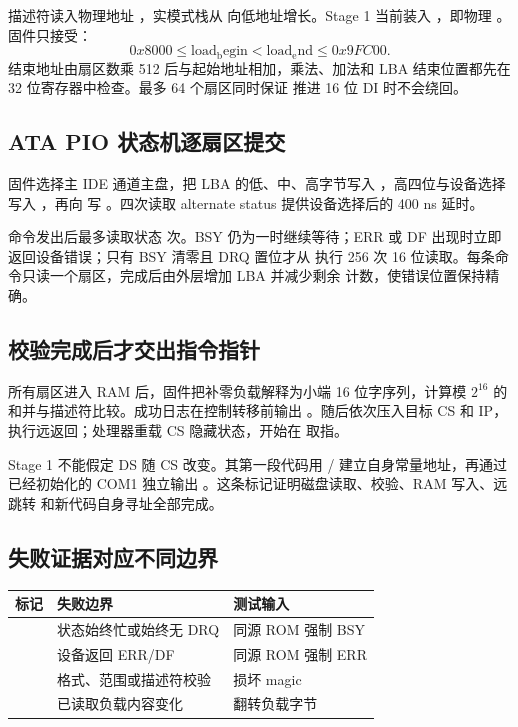 描述符读入物理地址 ，实模式栈从 
向低地址增长。Stage 1 当前装入 ，即物理
。固件只接受：
\[
  0x8000 \leq \mathrm{load_begin}
  < \mathrm{load_end} \leq 0x9FC00.
\]
结束地址由扇区数乘 512 后与起始地址相加，乘法、加法和 LBA 结束位置都先在
32 位寄存器中检查。最多 64 个扇区同时保证  推进 16 位 DI
时不会绕回。

\subsection{ATA PIO 状态机逐扇区提交}

固件选择主 IDE 通道主盘，把 LBA 的低、中、高字节写入
，高四位与设备选择写入 ，再向
 写 。四次读取 alternate status 提供设备选择后的
400 ns 延时。

命令发出后最多读取状态  次。BSY 仍为一时继续等待；ERR 或 DF
出现时立即返回设备错误；只有 BSY 清零且 DRQ 置位才从  执行
256 次 16 位读取。每条命令只读一个扇区，完成后由外层增加 LBA 并减少剩余
计数，使错误位置保持精确。

\subsection{校验完成后才交出指令指针}

所有扇区进入 RAM 后，固件把补零负载解释为小端 16 位字序列，计算模
\(2^{16}\) 的和并与描述符比较。成功日志在控制转移前输出
。随后依次压入目标 CS 和 IP，执行远返回；处理器重载
CS 隐藏状态，开始在  取指。

Stage 1 不能假定 DS 随 CS 改变。其第一段代码用 /
 建立自身常量地址，再通过已经初始化的 COM1 独立输出
。这条标记证明磁盘读取、校验、RAM 写入、远跳转
和新代码自身寻址全部完成。

\subsection{失败证据对应不同边界}

\small
\begin{longtable}{L{0.36\textwidth}L{0.23\textwidth}L{0.27\textwidth}}
\toprule
\textbf{标记} & \textbf{失败边界} & \textbf{测试输入}\\
\midrule
{} & 状态始终忙或始终无 DRQ & 同源 ROM 强制 BSY\\
 & 设备返回 ERR/DF & 同源 ROM 强制 ERR\\
 & 格式、范围或描述符校验 & 损坏 magic\\
 & 已读取负载内容变化 & 翻转负载字节\\
\bottomrule
\end{longtable}
\normalsize

